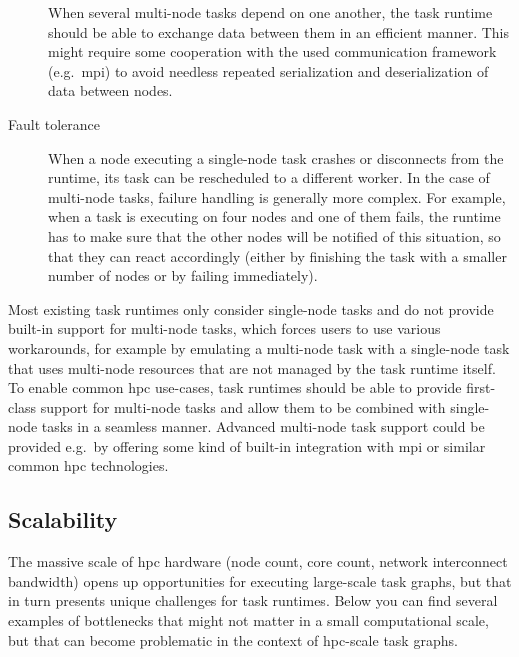 \begin{description}
		When several multi-node tasks depend on one another, the task runtime should be able to exchange
		data between them in an efficient manner. This might require some cooperation with the used
		communication framework (e.g.\ \gls{mpi}) to avoid needless repeated serialization
		and deserialization of data between nodes.
	\item[Fault tolerance] When a node executing a single-node task crashes or disconnects from the runtime, its task can be
		rescheduled to a different worker. In the case of multi-node tasks, failure handling is generally
		more complex. For example, when a task is executing on four nodes and one of them fails, the
		runtime has to make sure that the other nodes will be notified of this situation, so that they can
		react accordingly (either by finishing the task with a smaller number of nodes or by failing
		immediately).
\end{description}

Most existing task runtimes only consider single-node tasks and do not provide built-in support for
multi-node tasks, which forces users to use various workarounds, for example by emulating a
multi-node task with a single-node task that uses multi-node resources that are not managed by the
task runtime itself. To enable common \gls{hpc} use-cases, task runtimes should
be able to provide first-class support for multi-node tasks and allow them to be combined with
single-node tasks in a seamless manner. Advanced multi-node task support could be provided e.g.\ by
offering some kind of built-in integration with \gls{mpi} or similar common
\gls{hpc} technologies.

\subsection{Scalability}
The massive scale of \gls{hpc} hardware (node count, core count, network
interconnect bandwidth) opens up opportunities for executing large-scale task graphs, but that in
turn presents unique challenges for task runtimes. Below you can find several examples of
bottlenecks that might not matter in a small computational scale, but that can become problematic
in the context of \gls{hpc}-scale task graphs.

